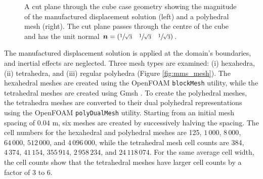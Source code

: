 \documentclass[sn-mathphys,Numbered]{sn-jnl}%
\newcommand{\bb}{\boldsymbol}
\begin{document}
\begin{figure}[htbp]
	\centering
	\caption{A cut plane through the cube case geometry showing the magnitude of the manufactured displacement solution (left) and a polyhedral mesh (right). The cut plane passes through the centre of the cube and has the unit normal $\bb{n} = (\sfrac{1}{\sqrt{3}} \quad \sfrac{1}{\sqrt{3}} \quad \sfrac{1}{\sqrt{3}})$.}
	\label{fig:mms}
\end{figure}

The manufactured displacement solution is applied at the domain's boundaries, and inertial effects are neglected.
Three mesh types are examined: (i) hexahedra, (ii) tetrahedra, and (iii) regular polyhedra (Figure \ref{fig:mms_mesh}).
The hexahedral meshes are created using the OpenFOAM \texttt{blockMesh} utility, while the tetrahedral meshes are created using Gmsh \citep{geuzaine2009gmsh}.
To create the polyhedral meshes, the tetrahedra meshes are converted to their dual polyhedral representations using the OpenFOAM \texttt{polyDualMesh} utility.
Starting from an initial mesh spacing of $0.04$ m, six meshes are created by successively halving the spacing.
The cell numbers for the hexahedral and polyhedral meshes are 125, $1\,000$, $8\,000$, $64\,000$, $512\,000$, and $4\,096\,000$, while the tetrahedral mesh cell counts are 384, $4\,374$, $41\,154$, $355\,914$, $2\,958\,234$, and $24\,118\,074$.
For the same average cell width, the cell counts show that the tetrahedral meshes have larger cell counts by a factor of 3 to 6.
\end{document}

